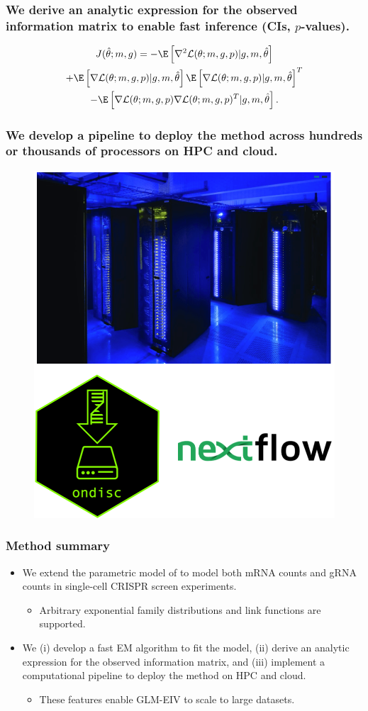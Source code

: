 \documentclass{beamer}
\begin{document}
\begin{frame}
\frametitle{We derive an analytic expression for the observed information matrix to enable fast inference (CIs, $p$-values).}
\begin{multline*}
J(\hat{\theta}; m, g) = -\E \left[\nabla^2 \mathcal{L}(\theta; m, g, p) | g, m, \hat{\theta} \right] \\ + \E\left[ \nabla \mathcal{L}(\theta; m, g, p) |  g, m, \hat{\theta} \right] \E\left[ \nabla \mathcal{L}(\theta; m, g, p) | g, m, \hat{\theta}\right]^T \\ - \E\left[ \nabla\mathcal{L}(\theta; m, g, p) \nabla \mathcal{L}(\theta; m, g, p)^T | g, m, \hat{\theta} \right].
\end{multline*}
\end{frame}

\begin{frame}
\frametitle{We develop a pipeline to deploy the method across hundreds or thousands of processors on HPC and cloud.}

\begin{figure}
	\centering
	\includegraphics[width=0.6\linewidth]{extra_figs/computing}
\end{figure}
\end{frame}

\begin{frame}
\frametitle{Method summary}
\begin{itemize}
\item We extend the parametric model of \cite{Sarkar2021} to model both mRNA counts and gRNA counts in single-cell CRISPR screen experiments.
\begin{itemize}
\item Arbitrary exponential family distributions and link functions are supported. 
\end{itemize}
\item We (i) develop a fast EM algorithm to fit the model, (ii) derive an analytic expression for the observed information matrix, and (iii) implement a computational pipeline to deploy the method on HPC and cloud. 
\begin{itemize}
\item These features enable GLM-EIV to scale to large datasets.
\end{itemize}
\end{itemize}
\end{frame}
\end{document}
